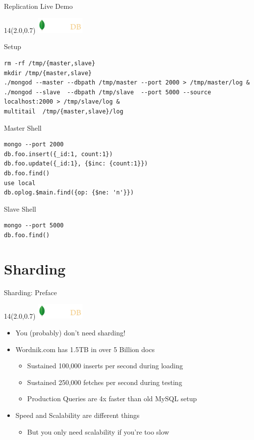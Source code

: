 \documentclass{beamer}
\newcommand{\MongoLogo}{
\begin{textblock}{14}(2.0,0.7)
  \includegraphics[height=0.8cm]{logo-mongodb-ondark.png}
\end{textblock}
}
\begin{document}
\begin{frame}[fragile]{Replication Live Demo}
  \MongoLogo

  \begin{block}{Setup}
    \tiny
    \begin{verbatim}
rm -rf /tmp/{master,slave}
mkdir /tmp/{master,slave}
./mongod --master --dbpath /tmp/master --port 2000 > /tmp/master/log &
./mongod --slave  --dbpath /tmp/slave  --port 5000 --source localhost:2000 > /tmp/slave/log &
multitail  /tmp/{master,slave}/log
    \end{verbatim}
  \end{block}

  \begin{block}{Master Shell}
    \tiny
    \begin{verbatim}
mongo --port 2000
db.foo.insert({_id:1, count:1})
db.foo.update({_id:1}, {$inc: {count:1}})
db.foo.find()
use local
db.oplog.$main.find({op: {$ne: 'n'}})
    \end{verbatim}
  \end{block}

  \begin{block}{Slave Shell}
    \tiny
    \begin{verbatim}
mongo --port 5000
db.foo.find()
    \end{verbatim}
  \end{block}

\end{frame}


\section{Sharding}
\begin{frame}[fragile]{Sharding: Preface}
  \MongoLogo
  \begin{itemize}
    \item You {\tiny (probably)} don't need sharding!

    \item Wordnik.com has 1.5TB in over 5 Billion docs
      \begin{itemize}
        \item Sustained 100,000 inserts per second during loading
        \item Sustained 250,000 fetches per second during testing
        \item Production Queries are 4x faster than old MySQL setup
      \end{itemize}

    \item Speed and Scalability are different things
      \begin{itemize}
        \item But you only need scalability if you're too slow
      \end{itemize}

  \end{itemize}
\end{frame}
\end{document}
